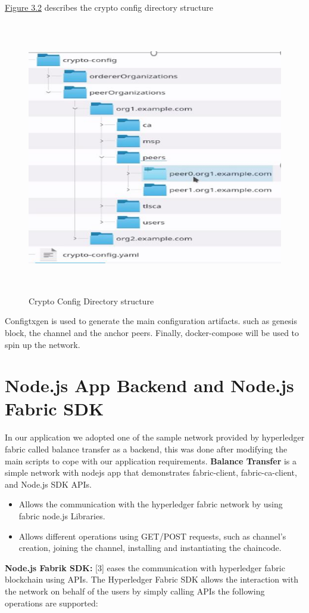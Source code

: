 \cleardoublepage

\hyperref[fig:cryptoconfig]{Figure 3.2} describes the crypto config directory structure  
 \begin{figure}[H]
\includegraphics[width=15cm,height=12cm]{images/cryptoconfig.jpg}
\caption{Crypto Config Directory structure}
\label{fig:cryptoconfig}
\end{figure}

Configtxgen is used to generate the main configuration artifacts. such as genesis block, the channel and the anchor peers. 
Finally, docker-compose will be used to spin up the network. 
\cleardoublepage


\section{Node.js App Backend and Node.js Fabric SDK} 
In our application we adopted one of the sample network provided by hyperledger fabric called balance transfer as a backend, this was done after modifying the main scripts to cope with our application requirements. 
\textbf{Balance Transfer} is a simple network with nodejs app that demonstrates fabric-client, fabric-ca-client, and Node.js SDK APIs.
\begin{itemize}
  \item Allows the communication with the hyperledger fabric network by using fabric node.js Libraries.
  \item Allows different operations using GET/POST requests, such as channel’s creation, joining the channel, installing and instantiating the chaincode.  
\end{itemize} 
\bigskip
\textbf{Node.js Fabrik SDK:} [3] eases the communication with hyperledger fabric blockchain using APIs. 
The Hyperledger Fabric SDK allows the interaction with the network on behalf of the users by simply calling APIs the following operations are supported: \\  

